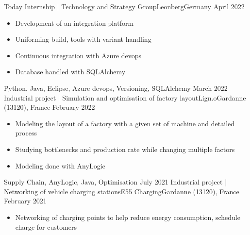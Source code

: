%
%
%
\begin{experiences}
  \experience
    {Today}   {Internship | Technology and Strategy Group}{Leonberg}{Germany}
    {April 2022} {
                      \begin{itemize}
                        \item Development of an integration platform                        
                        \item Uniforming build, tools with variant handling                   
                        \item Continuous integration with Azure devops               
                        \item Database handled with SQLAlchemy                                                                  
                      \end{itemize}
                    }
                    {Python, Java, Eclipse, Azure devops, Versioning, SQLAlchemy}
  \emptySeparator
  \experience
    {March 2022}     {Industrial project | Simulation and optimisation of factory layout}{Lign.o}{Gardanne (13120), France}
    {February 2022}    {
                      \begin{itemize}
                        \item Modeling the layout of a factory with a given set of machine and detailed process                          
                        \item Studying bottlenecks and production rate while changing multiple factors                     
                        \item Modeling done with AnyLogic
                      \end{itemize}
                    }
                    {Supply Chain, AnyLogic, Java, Optimisation}
  \emptySeparator
  \experience
    {July 2021}     {Industrial project | Networking of vehicle charging stations}{E55 Charging}{Gardanne (13120), France}
    {February 2021}    {
                      \begin{itemize}
                        \item Networking of charging points to help reduce energy consumption, schedule charge for customers

\end{itemize}}
\end{experiences}
